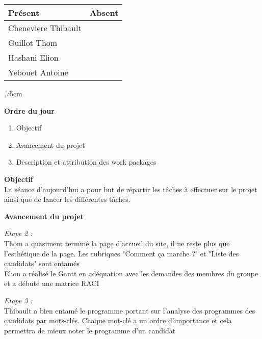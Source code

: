 \vskip 0.75cm

\begin{center}
\begin{tabular}[]{|l|l|}
     \hline 
     Présent & Absent\\
     \hline
     Cheneviere Thibault &\\ Guillot Thom & \\
     Hashani Elion &\\ Yebouet Antoine &\\
     \hline
\end{tabular}
\end{center}

,75cm

\noindent
\textbf{Ordre du jour}

\begin{enumerate}
    \item Objectif
    \item Avancement du projet
    \item Description et attribution des work packages
\end{enumerate}

\vskip 0.25cm

\noindent
\textbf{Objectif}\\
\noindent
La séance d'aujourd'hui a pour but de répartir les tâches à effectuer sur le projet ainsi que de lancer les différentes tâches.

\vskip 0.25cm

\noindent
\textbf{Avancement du projet}

\noindent
\textit{Etape 2 :} \\
Thom a quasiment terminé la page d'accueil du site, il ne reste plus que l'esthétique de la page. Les rubriques "Comment ça marche ?" et "Liste des candidats" sont entamés\\
Elion a réalisé le Gantt en adéquation avec les demandes des membres du groupe et a débuté une matrice RACI

\vskip 0.25cm

\noindent
\textit{Etape 3 :}\\
Thibault a bien entamé le programme portant sur l'analyse des programmes des candidats par mots-clés. Chaque mot-clé a un ordre d'importance et cela permettra de mieux noter le programme d'un candidat

\vskip 0.25cm

